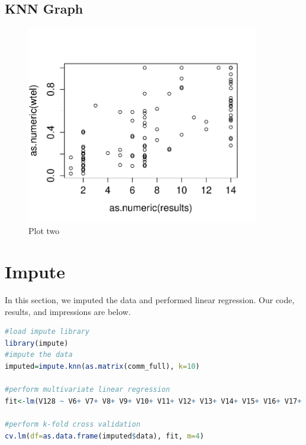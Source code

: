 \documentclass{article}
\begin{document}
\subsection{KNN Graph}
\begin{figure}[H]
\centering
\includegraphics[width=4in]{knn.pdf}
\caption{Plot two}\label{fig_container} 
\end{figure}

\section{Impute}
In this section, we imputed the data and performed linear regression. Our code,
results, and impressions are below. 

\begin{lstlisting}[language=r]
#load impute library
library(impute)
#impute the data
imputed=impute.knn(as.matrix(comm_full), k=10)

#perform multivariate linear regression
fit<-lm(V128 ~ V6+ V7+ V8+ V9+ V10+ V11+ V12+ V13+ V14+ V15+ V16+ V17+ V18+ V19+ V20+ V21+ V22+ V23+ V24+ V25+ V26+ V27+ V28+ V29+ V30+ V32+ V33+ V34+ V35+ V36+ V37+ V38+ V39+ V40+ V41+ V42+ V43+ V44+ V45+ V46+ V47+ V48+ V49+ V50+ V51+ V52+ V53+ V54+ V55+ V56+ V57+ V58+ V59+ V60+ V61+ V62+ V63+ V64+ V65+ V66+ V67+ V68+ V69+ V70+ V71+ V72+ V73+ V74+ V75+ V76+ V77+ V78+ V79+ V80+ V81+ V82+ V83+ V84+ V85+ V86+ V87+ V88+ V89+ V90+ V91+ V92+ V93+ V94+ V95+ V96+ V97+ V98+ V99+ V100+ V101+ V119+ V120+ V121+ V126, data=as.data.frame(imputed$data))

#perform k-fold cross validation
cv.lm(df=as.data.frame(imputed$data), fit, m=4)
\end{lstlisting}
\end{document}
